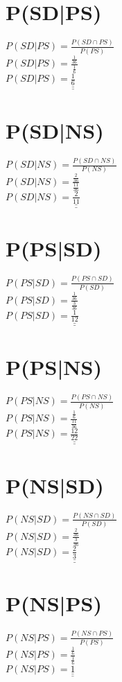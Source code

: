 \documentclass[a4paper]{article}
\def\doubleunderline#1{\underline{\underline{#1}}}
\begin{document}
\begin{multicols}{2}
\section*{P(SD|PS)}
$P(SD|PS) = \frac{P(SD \cap PS)}{P(PS)}$\\
$P(SD|PS) = \frac{\frac{1}{36}}{\frac{1}{6}}$\\
$P(SD|PS) = \doubleunderline{\frac{1}{6}}$

\section*{P(SD|NS)}
$P(SD|NS) = \frac{P(SD \cap NS)}{P(NS)}$\\
$P(SD|NS) = \frac{\frac{2}{36}}{\frac{11}{36}}$\\
$P(SD|NS) = \doubleunderline{\frac{2}{11}}$

\section*{P(PS|SD)}
$P(PS|SD) = \frac{P(PS \cap SD)}{P(SD)}$\\
$P(PS|SD) = \frac{\frac{1}{36}}{\frac{3}{36}}$\\
$P(PS|SD) = \doubleunderline{\frac{1}{12}}$

\section*{P(PS|NS)}
$P(PS|NS) = \frac{P(PS \cap NS)}{P(NS)}$\\
$P(PS|NS) = \frac{\frac{1}{6}}{\frac{11}{36}}$\\
$P(PS|NS) = \doubleunderline{\frac{12}{22}}$

\section*{P(NS|SD)}
$P(NS|SD) = \frac{P(NS \cap SD)}{P(SD)}$\\
$P(NS|SD) = \frac{\frac{2}{36}}{\frac{3}{36}}$\\
$P(NS|SD) = \doubleunderline{\frac{2}{3}}$

\section*{P(NS|PS)}
$P(NS|PS) = \frac{P(NS \cap PS)}{P(PS)}$\\
$P(NS|PS) = \frac{\frac{1}{6}}{\frac{1}{6}}$\\
$P(NS|PS) = \doubleunderline{1}$

\end{multicols}
\end{document}
